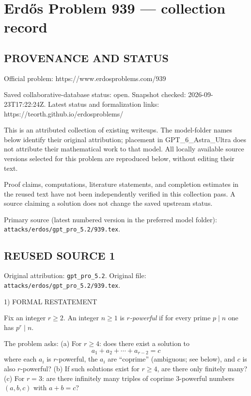 \section*{Erd\H{o}s Problem 939 --- collection record}

\subsection*{PROVENANCE AND STATUS}
Official problem: https://www.erdosproblems.com/939

Saved collaborative-database status: open.
Snapshot checked: 2026-09-23T17:22:24Z.
Latest status and formalization links: https://teorth.github.io/erdosproblems/

This is an attributed collection of existing writeups. The model-folder names below identify their original attribution; placement in GPT\_6\_Astra\_Ultra does not attribute their mathematical work to that model. All locally available source versions selected for this problem are reproduced below, without editing their text.

Proof claims, computations, literature statements, and completion estimates in the reused text have not been independently verified in this collection pass. A source claiming a solution does not change the saved upstream status.

Primary source (latest numbered version in the preferred model folder): \texttt{attacks/erdos/gpt\_pro\_5.2/939.tex}.

\subsection*{REUSED SOURCE 1}
Original attribution: \texttt{gpt\_pro\_5.2}.
Original file: \texttt{attacks/erdos/gpt\_pro\_5.2/939.tex}.


1) FORMAL RESTATEMENT

Fix an integer \(r\ge 2\). An integer \(n\ge 1\) is \emph{\(r\)-powerful} if for every prime \(p\mid n\) one has \(p^r\mid n\).

The problem asks:
(a) For \(r\ge 4\): does there exist a solution to
\[a_1+a_2+\cdots + a_{r-2}=c\]
where each \(a_i\) is \(r\)-powerful, the \(a_i\) are ``coprime'' (ambiguous; see below), and \(c\) is also \(r\)-powerful?
(b) If such solutions exist for \(r\ge 4\), are there only finitely many?
(c) For \(r=3\): are there infinitely many triples of coprime \(3\)-powerful numbers \((a,b,c)\) with \(a+b=c\)?

